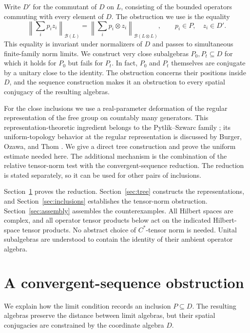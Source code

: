 \documentclass[11pt]{article}
\theoremstyle{definition}
\theoremstyle{remark}
\newcommand{\B}{\mathcal B}
\newcommand{\norm}[1]{\left\|#1\right\|}
\begin{document}
Write $D'$ for the commutant of $D$ on $L$, consisting of the bounded
operators commuting with every element of $D$. The obstruction we use is
the equality
\begin{equation}\label{eq:intro-test}
\norm{\sum_i p_i z_i}_{\B(L)}
=\norm{\sum_i p_i\otimes z_i}_{\B(L\otimes L)},
\qquad p_i\in P,\quad z_i\in D'.
\end{equation}
This equality is invariant under normalizers of $D$ and passes to
simultaneous finite-family norm limits. We construct very close subalgebras
$P_0,P_t\subseteq D$ for which it holds for $P_0$ but fails for $P_t$.
In fact, $P_0$ and $P_t$ themselves are conjugate by a unitary close to the
identity. The obstruction concerns their positions inside $D$, and the
sequence construction makes it an obstruction to every spatial conjugacy
of the resulting algebras.

For the close inclusions we use a real-parameter deformation of the regular
representation of the free group on countably many generators. This
representation-theoretic ingredient belongs to the Pytlik--Szwarc family
\cite{PS86}; its uniform-topology behavior at the regular representation
is discussed by Burger, Ozawa, and Thom \cite[Theorem~4.6]{BOT13}.
We give a direct tree construction and prove the uniform estimate needed
here. The additional mechanism is the combination of the relative
tensor-norm test with the convergent-sequence reduction. The reduction is
stated separately, so it can be used for other pairs of inclusions.

Section~\ref{sec:sequences} proves the reduction.
Section~\ref{sec:tree} constructs the representations, and
Section~\ref{sec:inclusions} establishes the tensor-norm obstruction.
Section~\ref{sec:assembly} assembles the counterexamples.
All Hilbert spaces are complex, and all operator tensor products below act
on the indicated Hilbert-space tensor products. No abstract choice of
$C^*$-tensor norm is needed. Unital subalgebras are understood to contain
the identity of their ambient operator algebra.

\section{A convergent-sequence obstruction}\label{sec:sequences}

We explain how the limit condition records an inclusion $P\subseteq D$.
The resulting algebras preserve the distance between limit algebras, but
their spatial conjugacies are constrained by the coordinate algebra $D$.
\end{document}
